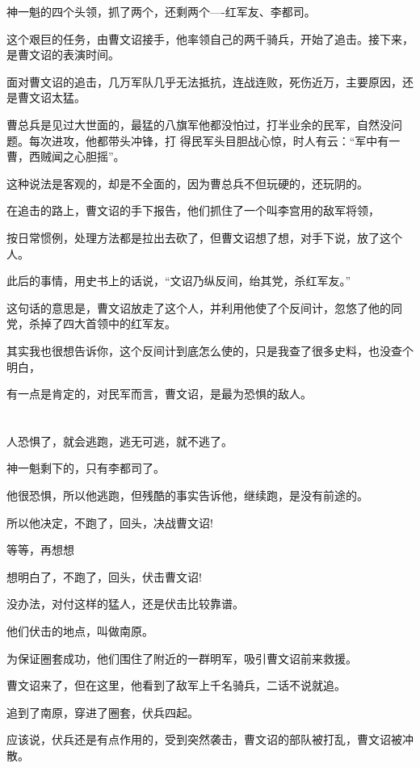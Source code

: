 \documentclass[11pt,a4paper,onecolumn]{article}
\begin{document}
神一魁的四个头领，抓了两个，还剩两个----红军友、李都司。

这个艰巨的任务，由曹文诏接手，他率领自己的两千骑兵，开始了追击。接下来，是曹文诏的表演时间。

面对曹文诏的追击，几万军队几乎无法抵抗，连战连败，死伤近万，主要原因，还是曹文诏太猛。

曹总兵是见过大世面的，最猛的八旗军他都没怕过，打半业余的民军，自然没问题。每次进攻，他都带头冲锋，打
得民军头目胆战心惊，时人有云：``军中有一曹，西贼闻之心胆摇''。

这种说法是客观的，却是不全面的，因为曹总兵不但玩硬的，还玩阴的。

在追击的路上，曹文诏的手下报告，他们抓住了一个叫李宫用的敌军将领，

按日常惯例，处理方法都是拉出去砍了，但曹文诏想了想，对手下说，放了这个人。

此后的事情，用史书上的话说，``文诏乃纵反间，绐其党，杀红军友。''

这句话的意思是，曹文诏放走了这个人，并利用他使了个反间计，忽悠了他的同党，杀掉了四大首领中的红军友。

其实我也很想告诉你，这个反间计到底怎么使的，只是我查了很多史料，也没查个明白，

有一点是肯定的，对民军而言，曹文诏，是最为恐惧的敌人。

\section[\thesection]{}

人恐惧了，就会逃跑，逃无可逃，就不逃了。

神一魁剩下的，只有李都司了。

他很恐惧，所以他逃跑，但残酷的事实告诉他，继续跑，是没有前途的。

所以他决定，不跑了，回头，决战曹文诏!

等等，再想想

想明白了，不跑了，回头，伏击曹文诏!

没办法，对付这样的猛人，还是伏击比较靠谱。

他们伏击的地点，叫做南原。

为保证圈套成功，他们围住了附近的一群明军，吸引曹文诏前来救援。

曹文诏来了，但在这里，他看到了敌军上千名骑兵，二话不说就追。

追到了南原，穿进了圈套，伏兵四起。

应该说，伏兵还是有点作用的，受到突然袭击，曹文诏的部队被打乱，曹文诏被冲散。
\end{document}

